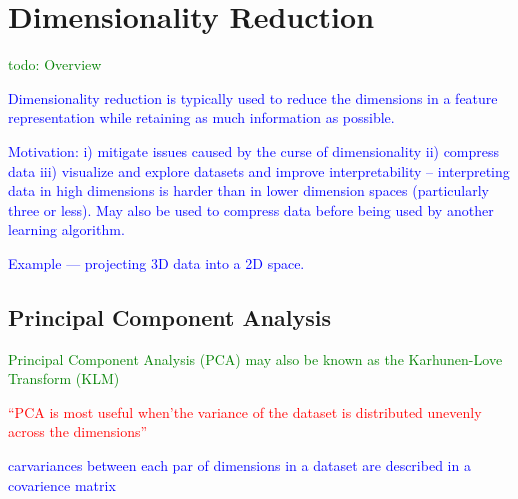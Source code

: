 \section{Dimensionality Reduction}

\textcolor{green}{todo: Overview}

\textcolor{blue}{Dimensionality reduction is typically used to reduce the dimensions in a feature representation while retaining as much information as possible.}

\textcolor{blue}{Motivation: i) mitigate issues caused by the curse of dimensionality ii) compress data iii) visualize and explore datasets and improve interpretability -- interpreting data in high dimensions is harder than in lower dimension spaces (particularly three or less). May also be used to compress data before being used by another learning algorithm.}

\textcolor{blue}{Example --- projecting 3D data into a 2D space.}

\subsection{Principal Component Analysis}

\textcolor{green}{{Principal Component Analysis (PCA)} may also be known as the {Karhunen-Love Transform (KLM)} }

\textcolor{red}{``PCA is most useful when'the variance of the dataset is distributed unevenly across the dimensions'' }

\textcolor{blue}{carvariances between each par of dimensions in a dataset are described in a {covarience matrix} }